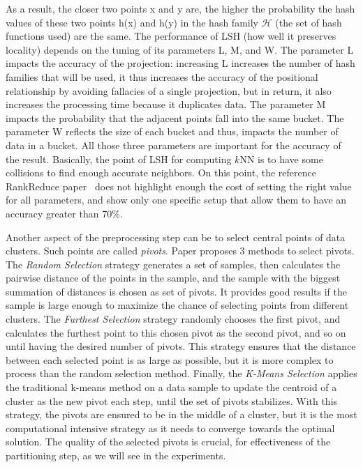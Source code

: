  As a result, the closer two points x and y are, the higher the probability the hash values of these two points h(x) and h(y) in the hash family $\mathcal{H}$ (the set of hash functions used) are the same. 
The performance of LSH (how well it preserves locality) depends on the tuning of its parameters L, M, and W. The 
parameter L impacts the accuracy of the projection: increasing L increases the number of hash families that will be used, it thus increases the accuracy of the positional 
relationship by avoiding fallacies of a single projection, but in return, it also increases the processing time 
because it duplicates data.
The parameter M impacts the probability that the adjacent points fall into the same bucket. The parameter W 
reflects the size of each bucket and thus, impacts the number of data in a bucket.
All those three parameters are important for the accuracy of the result. Basically, the point of LSH for computing $k$NN is to have some collisions to find enough accurate neighbors. On this point, the reference RankReduce paper~\cite{Stupar10rankreduce-} does not highlight enough the cost of setting the right value for all parameters, and show only one specific setup that allow them to have an accuracy greater than 70\%. 

Another aspect of the preprocessing step can be to select central points of data clusters. Such points are called 
\emph{pivots}. Paper \cite{Lu:2012:EPK:2336664.2336674} proposes 3 methods to select pivots. The \emph{Random 
Selection} strategy generates a set of samples, then calculates the pairwise distance of the points in the 
sample, and the sample with the biggest summation of distances is chosen as set of pivots. It 
provides good results if the sample is large enough to maximize the chance of selecting points from different 
clusters. The \emph{Furthest Selection} strategy randomly chooses the first pivot, and calculates the furthest 
point to this chosen pivot as the second pivot, and so on until having the desired number of pivots. This 
strategy ensures that the distance between each selected point is as large as possible, but it is more complex 
to process than the random selection method. Finally, the \emph{K-Means Selection} applies the traditional k-means 
method on a data sample to update the centroid of a cluster as the new pivot each step, until the set of 
pivots stabilizes. With this strategy, the pivots are ensured to be in the middle of a cluster, but it is 
the most computational intensive strategy as it needs to converge towards the optimal solution. The quality of 
the selected pivots is crucial, for effectiveness of the partitioning step, as we will see in the experiments.
